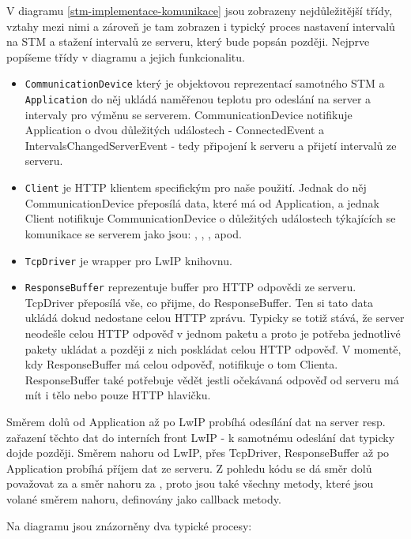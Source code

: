 V diagramu \ref{stm-implementace-komunikace} jsou zobrazeny nejdůležitější třídy, vztahy
mezi nimi a zároveň je tam zobrazen i typický proces nastavení intervalů na STM a stažení
intervalů ze serveru, který bude popsán později.
Nejprve popíšeme třídy v diagramu a jejich funkcionalitu.
\begin{itemize}
  \item \texttt{CommunicationDevice} který je objektovou reprezentací samotného STM a \texttt{Application}
    do něj ukládá naměřenou teplotu pro odeslání na server a intervaly pro výměnu se serverem.
    CommunicationDevice notifikuje Application o dvou důležitých událostech - ConnectedEvent a
    IntervalsChangedServerEvent - tedy připojení k serveru a přijetí intervalů ze serveru.
  \item \texttt{Client} je HTTP klientem specifickým pro naše použití. Jednak do něj CommunicationDevice
    přeposílá data, které má od Application, a jednak Client notifikuje CommunicationDevice o
    důležitých událostech týkajících se komunikace se serverem jako jsou: ,
    , , apod.
  \item \texttt{TcpDriver} je wrapper pro LwIP knihovnu.
  \item \texttt{ResponseBuffer} reprezentuje buffer pro HTTP odpovědi ze serveru. \\
    TcpDriver přeposílá vše, co přijme, do ResponseBuffer.
    Ten si tato data ukládá dokud nedostane celou HTTP zprávu.
    Typicky se totiž stává, že server neodešle celou HTTP odpověď v jednom paketu a proto je potřeba
    jednotlivé pakety ukládat a později z nich poskládat celou HTTP odpověď.
    V momentě, kdy ResponseBuffer má celou odpověď, notifikuje o tom Clienta.
    ResponseBuffer také potřebuje vědět jestli očekávaná odpověď od serveru má mít i tělo nebo pouze
    HTTP hlavičku.
\end{itemize}

Směrem dolů od Application až po LwIP probíhá odesílání dat na server resp. zařazení těchto dat
do interních front LwIP - k samotnému odeslání dat typicky dojde později.
Směrem nahoru od LwIP, přes TcpDriver, ResponseBuffer až po Application probíhá příjem dat ze serveru.
Z pohledu kódu se dá směr dolů považovat za  a směr nahoru za , proto
jsou také všechny metody, které jsou volané směrem nahoru, definovány jako callback metody.

Na diagramu jsou znázorněny dva typické procesy:

